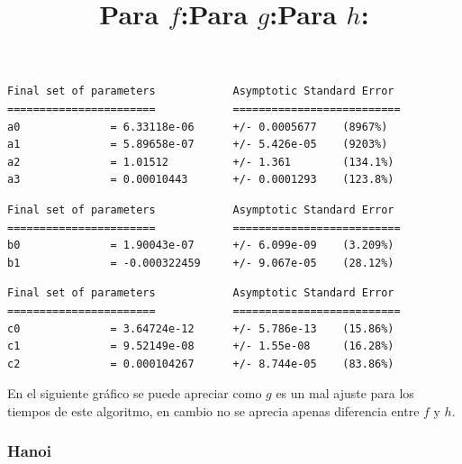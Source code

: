 \documentclass[a4]{article}
\begin{document}
\title{Para $f$:}
\begin{verbatim}
Final set of parameters            Asymptotic Standard Error
=======================            ==========================
a0              = 6.33118e-06      +/- 0.0005677    (8967%)
a1              = 5.89658e-07      +/- 5.426e-05    (9203%)
a2              = 1.01512          +/- 1.361        (134.1%)
a3              = 0.00010443       +/- 0.0001293    (123.8%)
\end{verbatim}
\title{Para $g$:}
\begin{verbatim}
Final set of parameters            Asymptotic Standard Error
=======================            ==========================
b0              = 1.90043e-07      +/- 6.099e-09    (3.209%)
b1              = -0.000322459     +/- 9.067e-05    (28.12%)
\end{verbatim}

\newpage
\title{Para $h$:}
\begin{verbatim}
Final set of parameters            Asymptotic Standard Error
=======================            ==========================
c0              = 3.64724e-12      +/- 5.786e-13    (15.86%)
c1              = 9.52149e-08      +/- 1.55e-08     (16.28%)
c2              = 0.000104267      +/- 8.744e-05    (83.86%)
\end{verbatim}

\begin{flushleft}
  En el siguiente gráfico se puede apreciar como $g$ es un mal ajuste
  para los tiempos de este algoritmo, en cambio no se aprecia apenas
diferencia entre $f$ y $h$.
\end{flushleft}

\begin{figure}[H] \centering
{}
\end{figure}

\subsubsection{Hanoi}
\end{document}
